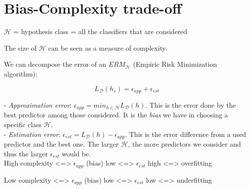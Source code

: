 \section*{Bias-Complexity trade-off}

\label{sec:bias-complexity-trade-off}

\vspace{5mm}

$\mathcal{H}$ = hypothesis class = all the classifiers that are considered

The size of $\mathcal{H}$ can be seen as a measure of complexity.

\vspace{5mm}

We can decompose the error of an $ERM_\mathcal{H}$ (Empiric Risk Minimization algorithm):

$$L_{\mathcal{D}}(h_s) = \epsilon_{app} + \epsilon_{est}$$

- \textit{Approximation error}: $\epsilon_{app} = min_{h \in \mathcal{H}} L_{\mathcal{D}}(h)$. This is the error done by the best predictor among those considered. It is the \textit{bias} we have in choosing a specific class $\mathcal{H}$. \\

- \textit{Estimation error}: $\epsilon_{est} = L_{\mathcal{D}}(h) - \epsilon_{app}$. This is the error difference from a used predictor and the best one. The larger $\mathcal{H}$, the more predictors we consider and thus the larger $\epsilon_{est}$ would be. \\

High complexity <=> $\epsilon_{app}$ (bias) low <=> $\epsilon_{est}$ high <=> overfitting

Low complexity <=> $\epsilon_{app}$ (bias) low <=> $\epsilon_{est}$ low <=> underfitting

\vspace{5mm}